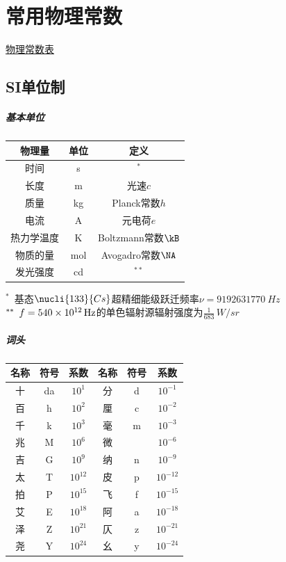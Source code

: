 \chapter{常用物理常数}
\href{https://en.wikipedia.org/wiki/List_of_physical_constants}{物理常数表}
\section{SI单位制}
\paragraph{基本单位}
\begin{center}
	\begin{tabular}{ccc}
		\toprule
		物理量&单位&定义\\
		\midrule
		时间&s&$^\ast$\\
		长度&m&光速$c$\\%
		质量&kg&Planck常数$h$\\%
		电流&A&元电荷$e$\\%
		热力学温度&K&Boltzmann常数$\kB$\\%
		物质的量&mol&Avogadro常数$\NA$\\
		发光强度&cd&$^{\ast\ast}$\\
		\bottomrule
	\end{tabular}
\end{center}
$^\ast\enspace$基态$\nucli{133}{Cs}$超精细能级跃迁频率$\nu=\SI{9192631770}{Hz}$\\
\noindent
$^{\ast\ast}\enspace f=\SI{540E12}{Hz}$的单色辐射源辐射强度为$\frac1{683}\,\si{W/sr}$
\paragraph{词头}
\begin{center}
	\begin{tabular}{ccc|ccc}
		\toprule
		名称&符号&系数&名称&符号&系数\\
		\midrule
		十&da&$10^1$&分&d&$10^{-1}$\\
		百&h&$10^2$&厘&c&$10^{-2}$\\
		千&k&$10^3$&毫&m&$10^{-3}$\\
		兆&M&$10^6$&微&\si{\ \micro\ }&$10^{-6}$\\
		吉&G&$10^9$&纳&n&$10^{-9}$\\
		太&T&$10^{12}$&皮&p&$10^{-12}$\\
		拍&P&$10^{15}$&飞&f&$10^{-15}$\\
		艾&E&$10^{18}$&阿&a&$10^{-18}$\\
		泽&Z&$10^{21}$&仄&z&$10^{-21}$\\
		尧&Y&$10^{24}$&幺&y&$10^{-24}$\\
		\bottomrule
	\end{tabular}
\end{center}
